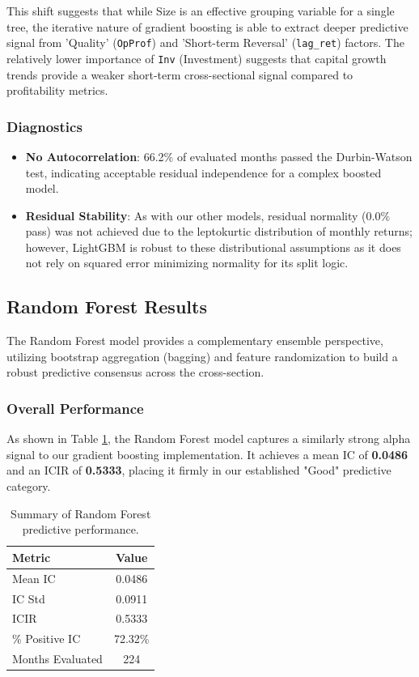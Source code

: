 \documentclass[11pt]{article}
\begin{document}
This shift suggests that while Size is an effective grouping variable for a single tree, the iterative nature of gradient boosting is able to extract deeper predictive signal from 'Quality' (\texttt{OpProf}) and 'Short-term Reversal' (\texttt{lag\_ret}) factors. The relatively lower importance of \texttt{Inv} (Investment) suggests that capital growth trends provide a weaker short-term cross-sectional signal compared to profitability metrics.

\subsubsection{Diagnostics}
\begin{itemize}
    \item \textbf{No Autocorrelation}: 66.2\% of evaluated months passed the Durbin-Watson test, indicating acceptable residual independence for a complex boosted model.
    \item \textbf{Residual Stability}: As with our other models, residual normality (0.0\% pass) was not achieved due to the leptokurtic distribution of monthly returns; however, LightGBM is robust to these distributional assumptions as it does not rely on squared error minimizing normality for its split logic.
\end{itemize}

\subsection{Random Forest Results}
The Random Forest model provides a complementary ensemble perspective, utilizing bootstrap aggregation (bagging) and feature randomization to build a robust predictive consensus across the cross-section.

\subsubsection{Overall Performance}
As shown in Table \ref{tab:rf_results}, the Random Forest model captures a similarly strong alpha signal to our gradient boosting implementation. It achieves a mean IC of \textbf{0.0486} and an ICIR of \textbf{0.5333}, placing it firmly in our established "Good" predictive category.

\begin{table}[H]
\centering
\begin{tabular}{lc}
\toprule
\textbf{Metric} & \textbf{Value} \\
\midrule
Mean IC & 0.0486 \\
IC Std & 0.0911 \\
ICIR & 0.5333 \\
\% Positive IC & 72.32\% \\
Months Evaluated & 224 \\
\bottomrule
\end{tabular}
\caption{Summary of Random Forest predictive performance.}
\label{tab:rf_results}
\end{table}
\end{document}
